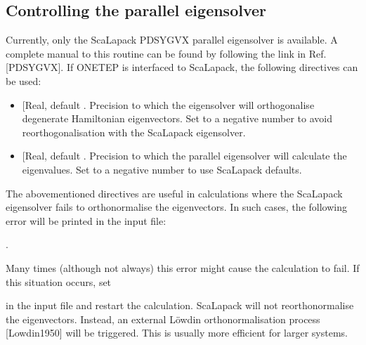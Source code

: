 \documentclass[letterpaper,10pt,english]{sphinxmanual}
\begin{document}
\subsection{Controlling the parallel eigensolver}
\label{\detokenize{onetep_edft_documentation:controlling-the-parallel-eigensolver}}
Currently, only the ScaLapack PDSYGVX parallel eigensolver is available.
A complete manual to this routine can be found by following the link in
Ref. {[}PDSYGVX{]}. If ONETEP is interfaced to ScaLapack,
the following directives can be used:
\begin{itemize}
\item {} 
 {[}Real, default
\sphinxcode{eigensolver\_orfac: 1.0e-4}{]}. Precision to which the eigensolver
will orthogonalise degenerate Hamiltonian eigenvectors. Set to a
negative number to avoid reorthogonalisation with the ScaLapack
eigensolver.

\item {} 
 {[}Real, default
\sphinxcode{eigensolver\_abstol: 1.0e-9}{]}. Precision to which the parallel
eigensolver will calculate the eigenvalues. Set to a negative number
to use ScaLapack defaults.

\end{itemize}

The abovementioned directives are useful in calculations where the
ScaLapack eigensolver fails to orthonormalise the eigenvectors. In such
cases, the following error will be printed in the input file:

.

\begin{DUlineblock}{0em}
\item[] Many times (although not always) this error might cause the
calculation to fail. If this situation occurs, set
\item[] 
\item[] 
\item[] in the input file and restart the calculation. ScaLapack will not
reorthonormalise the eigenvectors. Instead, an external Löwdin
orthonormalisation process {[}Lowdin1950{]} will be
triggered. This is usually more efficient for larger systems.
\end{DUlineblock}
\end{document}
